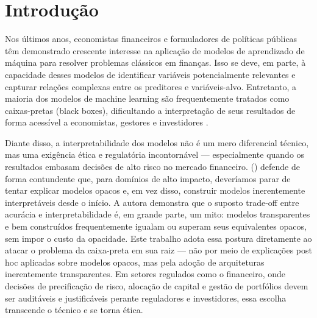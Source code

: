 \documentclass[	12pt, Times, openright, oneside, a4paper, english, brazil]{abntex2}
\begin{document}

\tableofcontents*
\cleardoublepage

\textual



\chapter{Introdução}

Nos últimos anos, economistas financeiros e formuladores de políticas públicas têm demonstrado crescente interesse na aplicação de modelos de aprendizado de máquina para resolver problemas clássicos em finanças. Isso se deve, em parte, à capacidade desses modelos de identificar variáveis potencialmente relevantes e capturar relações complexas entre os preditores e variáveis-alvo. Entretanto, a maioria dos modelos de machine learning são frequentemente tratados como caixas-pretas (black boxes), dificultando a interpretação de seus resultados de forma acessível a economistas, gestores e investidores \cite{brigo2021interpretabilitydeeplearningfinance}.

Diante disso, a interpretabilidade dos modelos não é um mero diferencial técnico, mas uma exigência ética e regulatória incontornável — especialmente quando os resultados embasam decisões de alto risco no mercado financeiro. \citeauthor{rudin2019stopexplainingblackbox} (\citeyear{rudin2019stopexplainingblackbox}) defende de forma contundente que, para domínios de alto impacto, deveríamos parar de tentar explicar modelos opacos e, em vez disso, construir modelos inerentemente interpretáveis desde o início. A autora demonstra que o suposto trade-off entre acurácia e interpretabilidade é, em grande parte, um mito: modelos transparentes e bem construídos frequentemente igualam ou superam seus equivalentes opacos, sem impor o custo da opacidade. Este trabalho adota essa postura diretamente ao atacar o problema da caixa-preta em sua raiz — não por meio de explicações post hoc aplicadas sobre modelos opacos, mas pela adoção de arquiteturas inerentemente transparentes. Em setores regulados como o financeiro, onde decisões de precificação de risco, alocação de capital e gestão de portfólios devem ser auditáveis e justificáveis perante reguladores e investidores, essa escolha transcende o técnico e se torna ética.
\end{document}
